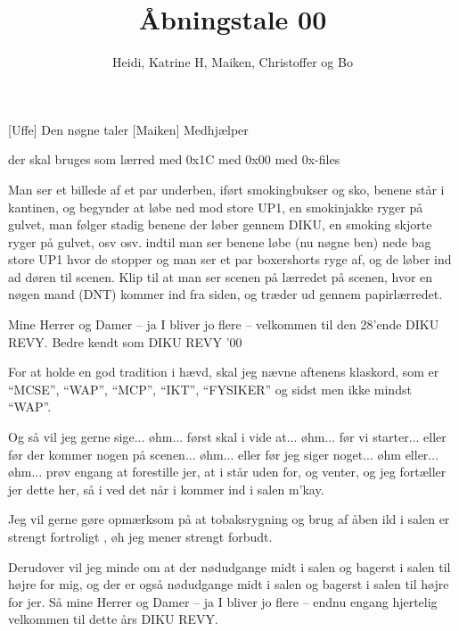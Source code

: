 \documentclass[danish]{article}
\title{Åbningstale 00}
\author{Heidi, Katrine H, Maiken, Christoffer og Bo}
\begin{document}
\maketitle

\begin{roles}
  [Uffe] Den nøgne taler
  [Maiken] Medhjælper
\end{roles}

\begin{props}
   der skal bruges som lærred
   med 0x1C
   med 0x00
   med 0x-files
\end{props}

\begin{sketch}

\scene Man ser et billede af et par underben, iført smokingbukser og sko, benene
står i kantinen, og begynder at løbe ned mod store UP1, en smokinjakke ryger på
gulvet, man følger stadig benene der løber gennem DIKU, en smoking skjorte ryger
på gulvet, osv osv. indtil man ser benene løbe (nu nøgne ben) nede bag store
UP1 hvor de stopper og man ser et par boxershorts ryge af, og de løber ind ad
døren til scenen. Klip til at man ser scenen på lærredet på scenen, hvor en nøgen
mand (DNT) kommer ind fra siden, og træder ud gennem papirlærredet.

 Mine Herrer og Damer -- ja I bliver jo flere -- velkommen til den
28'ende  DIKU REVY. Bedre kendt som DIKU REVY '00

 For at holde en god tradition i hævd, skal jeg nævne aftenens
klaskord, som er ``MCSE'', ``WAP'', ``MCP'', ``IKT'', ``FYSIKER'' og sidst men
ikke mindst ``WAP''.

 Og så vil jeg gerne sige... øhm... først skal i vide at... øhm... før
vi starter... eller før der kommer nogen på scenen... øhm... eller før jeg siger
noget... øhm eller... øhm... prøv engang at forestille jer, at i står uden for,
og venter, og jeg fortæller jer dette her, så i ved det når i kommer ind i salen
m'kay.

 Jeg vil gerne gøre opmærksom på at tobaksrygning og brug af åben ild
i salen er strengt fortroligt , øh jeg mener strengt forbudt. 

 Derudover vil jeg minde om at der nødudgange midt i salen og bagerst
i salen til højre for mig, og der er også nødudgange midt i salen og bagerst i
salen til højre for jer. Så mine Herrer og Damer -- ja I bliver jo flere --
endnu engang hjertelig velkommen til dette års DIKU REVY.

\end{sketch}
\end{document}
